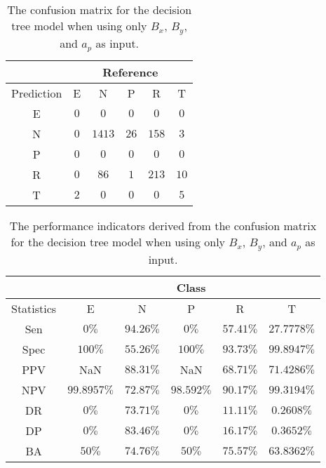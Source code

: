 \begin{table}[!ht]
	\centering
	\begin{tabular}{|c|c|c|c|c|c|}
		\hline
		 & \multicolumn{5}{|c|}{Reference} \\ \hline
		 Prediction & E & N & P & R & T \\ \hline
		 E & $0$ & $0$ & $0$ & $0$ & $0$ \\ \hline
		 N & $0$ & $1413$ & $26$ & $158$ & $3$ \\ \hline
		 P & $0$ & $0$ & $0$ & $0$ & $0$ \\ \hline
		 R & $0$ & $86$ & $1$ & $213$ & $10$ \\ \hline
		 T & $2$ & $0$ & $0$ & $0$ & $5$ \\ \hline
	\end{tabular}
	\caption{The confusion matrix for the decision tree model when using only $B_{x}$, $B_{y}$, and $a_{p}$ as input.}
	\label{tab:cm:xyap:C5.0}
\end{table}

\begin{table}[!ht]
	\centering
	\begin{tabular}{|c|c|c|c|c|c|}
		\hline
		 & \multicolumn{5}{c|}{Class} \\ \hline
		Statistics & E & N & P & R & T \\ \hline
		Sen & $0\%$ & $94.26\%$ & $0\%$ & $57.41\%$ & $27.7778\%$ \\ \hline
		Spec & $100\%$ & $55.26\%$ & $100\%$ & $93.73\%$ & $99.8947\%$ \\ \hline
		PPV & NaN & $88.31\%$ & NaN & $68.71\%$ & $71.4286\%$ \\ \hline
		NPV & $99.8957\%$ & $72.87\%$ & $98.592\%$ & $90.17\%$ & $99.3194\%$ \\ \hline
		DR & $0\%$ & $73.71\%$ & $0\%$ & $11.11\%$ & $0.2608\%$ \\ \hline
		DP & $0\%$ & $83.46\%$ & $0\%$ & $16.17\%$ & $0.3652\%$ \\ \hline
		BA & $50\%$ & $74.76\%$ & $50\%$ & $75.57\%$ & $63.8362\%$ \\ \hline
	\end{tabular}
	\caption{The performance indicators derived from the confusion matrix for the decision tree model when using only $B_{x}$, $B_{y}$, and $a_{p}$ as input.}
	\label{tab:cs:reverse:xyap:C5.0}
\end{table}
